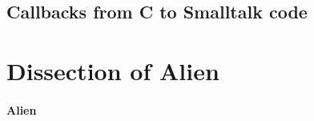 \documentclass[a4paper,10pt,twoside]{book}
\begin{document}
\subsection{Callbacks from C to Smalltalk code} \label{sec:callbacks_from_c_to_smalltalk_code} %





\section{Dissection of Alien} \label{sec:dissection_of_alien} %


\paragraph{Alien}
% 
% 
% 
% 
% 	
\end{document}
